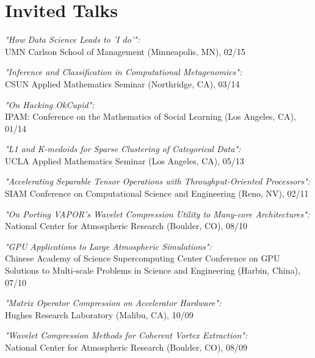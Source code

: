 \section{\sc Invited Talks}

{\it "How Data Science Leads to 'I do'":}\\ {UMN Carlson School of Management (Minneapolis, MN), 02/15}

{\it "Inference and Classification in Computational Metagenomics":}\\ {CSUN Applied Mathematics Seminar (Northridge, CA), 03/14}

{\it "On Hacking OkCupid":}\\ {IPAM: Conference on the Mathematics of Social Learning (Los Angeles, CA), 01/14}

{\it "L1 and K-medoids for Sparse Clustering of Categorical Data":}\\ {UCLA Applied Mathematics Seminar (Los Angeles, CA), 05/13}


{\it "Accelerating Separable Tensor Operations with Throughput-Oriented Processors":}\\{ SIAM Conference on Computational Science and Engineering (Reno, NV), 02/11}

{\it "On Porting VAPOR's Wavelet Compression Utility to Many-core Architectures":}\\{National Center for Atmospheric Research (Boulder, CO), 08/10}

{\it "GPU Applications to Large Atmospheric Simulations":}\\{Chinese Academy of Science Supercomputing Center Conference on GPU Solutions to Multi-scale Problems in Science and Engineering (Harbin, China), 07/10}

{\it "Matrix Operator Compression on Accelerator Hardware":}\\{Hughes Research Laboratory (Malibu, CA), 10/09}

{\it "Wavelet Compression Methods for Coherent Vortex Extraction":}\\{National Center for Atmospheric Research (Boulder, CO), 08/09}



